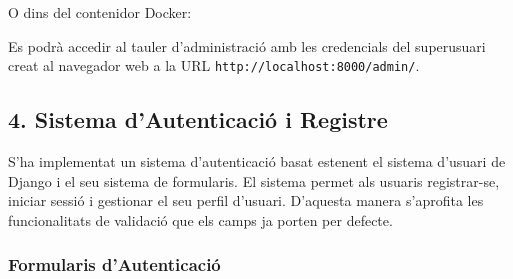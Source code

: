 \begin{Shaded}
\begin{Highlighting}[]
\end{Highlighting}
\end{Shaded}

O dins del contenidor Docker:

\begin{Shaded}
\begin{Highlighting}[]
\end{Highlighting}
\end{Shaded}

Es podrà accedir al tauler d'administració amb les credencials del
superusuari creat al navegador web a la URL
\texttt{http://localhost:8000/admin/}.

\hypertarget{sistema-dautenticaciuxf3-i-registre}{%
\subsection{4. Sistema d'Autenticació i
Registre}\label{sistema-dautenticaciuxf3-i-registre}}

S'ha implementat un sistema d'autenticació basat estenent el sistema
d'usuari de Django i el seu sistema de formularis. El sistema permet als
usuaris registrar-se, iniciar sessió i gestionar el seu perfil d'usuari.
D'aquesta manera s'aprofita les funcionalitats de validació que els
camps ja porten per defecte.

\hypertarget{formularis-dautenticaciuxf3}{%
\subsubsection{Formularis
d'Autenticació}\label{formularis-dautenticaciuxf3}}

